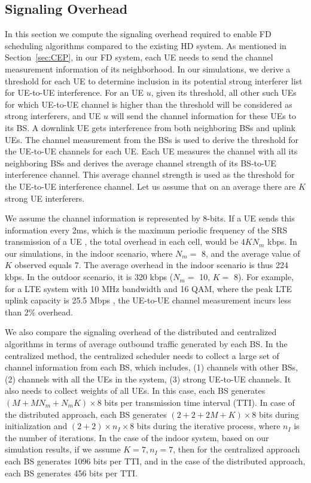 \documentclass[journal]{IEEEtran}
\begin{document}
\subsection{Signaling Overhead}
In this section we compute the signaling overhead required to enable FD scheduling algorithms compared to the existing HD system. As mentioned in Section~\ref{sec:CEP}, in our FD system, each UE needs to send the channel measurement information of its neighborhood. In our simulations, we derive a threshold for each UE to determine inclusion in its potential strong interferer list for UE-to-UE interference. For an UE $u$, given its threshold, all other such UEs for which UE-to-UE channel is higher than the threshold will be considered as strong interferers, and UE $u$ will send the channel information for these UEs to its BS. A downlink UE gets interference from both neighboring BSs and uplink UEs. The channel measurement from the BSs is used to derive the threshold for the UE-to-UE channels for each UE. Each UE measures the channel with all its neighboring BSs and derives the average channel strength of its BS-to-UE interference channel. This average channel strength is used as the threshold for the UE-to-UE interference channel. Let us assume that on an average there are $K$ strong UE interferers. 

We assume the channel information is represented by 8-bits. If a UE sends this information every 2ms, which is the maximum periodic frequency of the SRS transmission of a UE \cite{DahlmanLTE}, the total overhead in each cell, would be $4KN_m$ kbps. In our simulations, in the indoor scenario, where $N_m =$ 8, and the average value of $K$ observed equals 7. The average overhead in the indoor scenario is thus 224 kbps. In the outdoor scenario, it is 320 kbps ($N_m =$ 10, $K = $ 8). For example, for a LTE system with 10 MHz bandwidth and 16 QAM, where the peak LTE uplink capacity is 25.5 Mbps \cite{3GPP:5},  the UE-to-UE channel measurement incurs less than 2$\%$ overhead. 

We also compare the signaling overhead of the distributed and centralized algorithms in terms of average outbound traffic generated by each BS. In the centralized method, the centralized scheduler needs to collect a large set of channel information from each BS, which includes, (1) channels with other BSs, (2) channels with all the UEs in the system, (3) strong UE-to-UE channels. It also needs to collect weights of all UEs. In this case, each BS generates $(M + M N_m + N_m K) \times 8$ bits per transmission time interval (TTI). In case of the distributed approach, each BS generates $(2 + 2 + 2M + K) \times 8$ bits during initialization and $(2+2) \times n_I \times 8$ bits during the iterative process, where $n_I$ is the number of iterations. In the case of the indoor system, based on our simulation results, if we assume $K = 7, n_I = 7$, then for the centralized approach each BS generates 1096 bits per TTI, and in the case of the distributed approach, each BS generates 456 bits per TTI.
\end{document}
